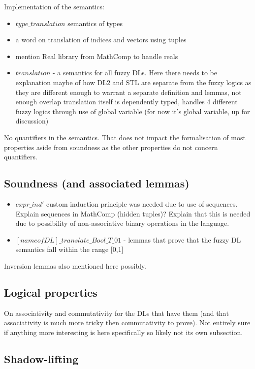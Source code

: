 \documentclass[a4paper,UKenglish,cleveref, autoref, thm-restate]{lipics-v2021}
\begin{document}
Implementation of the semantics: 
\begin{itemize}
	\item $type\_translation$ semantics of types
	\item a word on translation of indices and vectors using tuples
	\item mention Real library from MathComp to handle reals
	\item $translation$ - a semantics for all fuzzy DLs. Here there needs to be explanation maybe of how DL2 and STL are separate from the fuzzy logics as they are different enough to warrant a separate definition and lemmas, not enough overlap
	translation itself is dependently typed, handles 4 different fuzzy logics through use of global variable (for now it's global variable, up for discussion)
	
\end{itemize}

No quantifiers in the semantics. That does not impact the formalisation of most properties aside from soundness as the other properties do not concern quantifiers.

\subsection{Soundness (and associated lemmas)}

\begin{itemize}
	\item $expr\_ind'$ custom induction principle was needed due to use of sequences. Explain sequences in MathComp (hidden tuples)? Explain that this is needed due to possibility of non-associative binary operations in the language.
	\item $[name of DL]\_translate\_Bool\_T\_01$ - lemmas that prove that the fuzzy DL semantics fall within the range [0,1]
\end{itemize}

Inversion lemmas also mentioned here possibly.

\subsection{Logical properties}

On associativity and commutativity for the DLs that have them (and that associativity is much more tricky then commutativity to prove). Not entirely sure if anything more interesting is here specifically so likely not its own subsection.

\subsection{Shadow-lifting}
\end{document}
